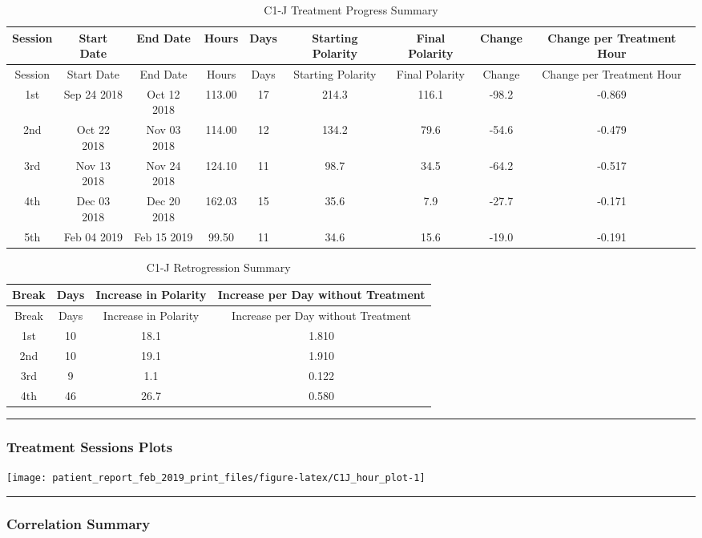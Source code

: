 \documentclass[]{article}
\begin{document}
\begin{longtable}[]{@{}ccccccccc@{}}
\caption{C1-J Treatment Progress Summary}\tabularnewline
\toprule
Session & Start Date & End Date & Hours & Days & Starting Polarity &
Final Polarity & Change & Change per Treatment Hour\tabularnewline
\midrule
\endfirsthead
\toprule
Session & Start Date & End Date & Hours & Days & Starting Polarity &
Final Polarity & Change & Change per Treatment Hour\tabularnewline
\midrule
\endhead
1st & Sep 24 2018 & Oct 12 2018 & 113.00 & 17 & 214.3 & 116.1 & -98.2 &
-0.869\tabularnewline
2nd & Oct 22 2018 & Nov 03 2018 & 114.00 & 12 & 134.2 & 79.6 & -54.6 &
-0.479\tabularnewline
3rd & Nov 13 2018 & Nov 24 2018 & 124.10 & 11 & 98.7 & 34.5 & -64.2 &
-0.517\tabularnewline
4th & Dec 03 2018 & Dec 20 2018 & 162.03 & 15 & 35.6 & 7.9 & -27.7 &
-0.171\tabularnewline
5th & Feb 04 2019 & Feb 15 2019 & 99.50 & 11 & 34.6 & 15.6 & -19.0 &
-0.191\tabularnewline
\bottomrule
\end{longtable}

\begin{longtable}[]{@{}cccc@{}}
\caption{C1-J Retrogression Summary}\tabularnewline
\toprule
Break & Days & Increase in Polarity & Increase per Day without
Treatment\tabularnewline
\midrule
\endfirsthead
\toprule
Break & Days & Increase in Polarity & Increase per Day without
Treatment\tabularnewline
\midrule
\endhead
1st & 10 & 18.1 & 1.810\tabularnewline
2nd & 10 & 19.1 & 1.910\tabularnewline
3rd & 9 & 1.1 & 0.122\tabularnewline
4th & 46 & 26.7 & 0.580\tabularnewline
\bottomrule
\end{longtable}

\begin{center}\rule{0.5\linewidth}{\linethickness}\end{center}

\subsubsection{Treatment Sessions Plots}\label{treatment-sessions-plots}

\texttt{[image: patient\_report\_feb\_2019\_print\_files/figure-latex/C1J\_hour\_plot-1]}

\begin{center}\rule{0.5\linewidth}{\linethickness}\end{center}

\subsubsection{Correlation Summary}\label{correlation-summary}
\end{document}
